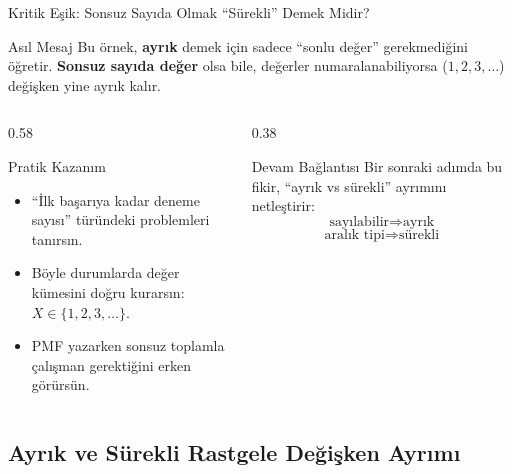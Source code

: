 ﻿\documentclass[light]{lutbeamer}
\begin{document}
\begin{frame}{Kritik Eşik: Sonsuz Sayıda Olmak ``Sürekli'' Demek Midir?}
\small
\begin{block}{Asıl Mesaj}
Bu örnek, \textbf{ayrık} demek için sadece ``sonlu değer'' gerekmediğini öğretir.
\textbf{Sonsuz sayıda değer} olsa bile, değerler numaralanabiliyorsa (\(1,2,3,\dots\)) değişken yine ayrık kalır.
\end{block}

\begin{columns}[T]
  \begin{column}{0.58\textwidth}
    \begin{alertblock}{Pratik Kazanım}
      \begin{itemize}
        \item ``İlk başarıya kadar deneme sayısı'' türündeki problemleri tanırsın.
        \item Böyle durumlarda değer kümesini doğru kurarsın: \(X\in\{1,2,3,\dots\}\).
        \item PMF yazarken sonsuz toplamla çalışman gerektiğini erken görürsün.
      \end{itemize}
    \end{alertblock}
  \end{column}
  \begin{column}{0.38\textwidth}
    \begin{block}{Devam Bağlantısı}
      Bir sonraki adımda bu fikir, ``ayrık vs sürekli'' ayrımını netleştirir:
      \[
      \text{sayılabilir} \Rightarrow \text{ayrık}
      \]
      \[
      \text{aralık tipi} \Rightarrow \text{sürekli}
      \]
    \end{block}
  \end{column}
\end{columns}
\end{frame}
\subsection{Ayrık ve Sürekli Rastgele Değişken Ayrımı}
\end{document}
